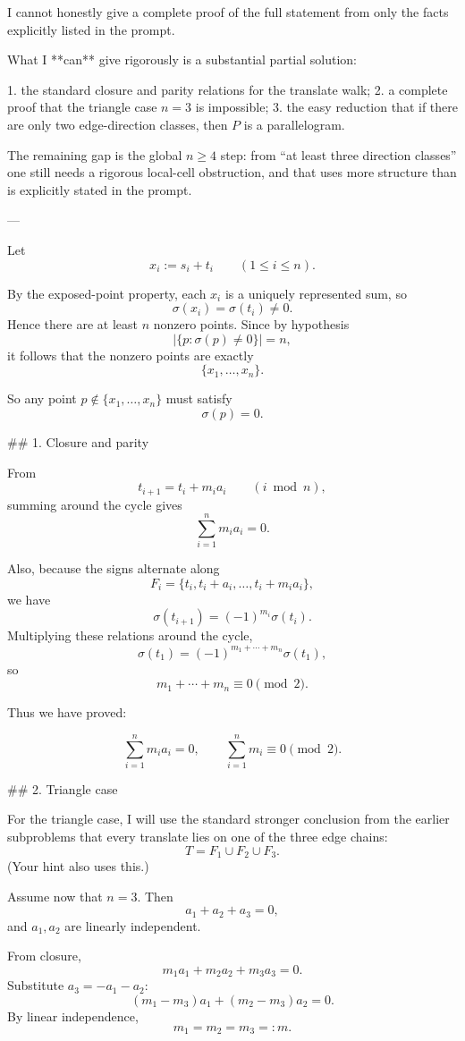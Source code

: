 I cannot honestly give a complete proof of the full statement from only the facts explicitly listed in the prompt.

What I **can** give rigorously is a substantial partial solution:

1. the standard closure and parity relations for the translate walk;
2. a complete proof that the triangle case \(n=3\) is impossible;
3. the easy reduction that if there are only two edge-direction classes, then \(P\) is a parallelogram.

The remaining gap is the global \(n\ge 4\) step: from “at least three direction classes” one still needs a rigorous local-cell obstruction, and that uses more structure than is explicitly stated in the prompt.

---

Let
\[
x_i:=s_i+t_i \qquad (1\le i\le n).
\]

By the exposed-point property, each \(x_i\) is a uniquely represented sum, so
\[
\sigma(x_i)=\sigma(t_i)\neq 0.
\]
Hence there are at least \(n\) nonzero points. Since by hypothesis
\[
|\{p:\sigma(p)\neq 0\}|=n,
\]
it follows that the nonzero points are exactly
\[
\{x_1,\dots,x_n\}.
\]

So any point \(p\notin \{x_1,\dots,x_n\}\) must satisfy
\[
\sigma(p)=0.
\]

## 1. Closure and parity

From
\[
t_{i+1}=t_i+m_i a_i \qquad (i \bmod n),
\]
summing around the cycle gives
\[
\sum_{i=1}^n m_i a_i = 0.
\]

Also, because the signs alternate along
\[
F_i=\{t_i,t_i+a_i,\dots,t_i+m_i a_i\},
\]
we have
\[
\sigma(t_{i+1}) = (-1)^{m_i}\sigma(t_i).
\]
Multiplying these relations around the cycle,
\[
\sigma(t_1)=(-1)^{m_1+\cdots+m_n}\sigma(t_1),
\]
so
\[
m_1+\cdots+m_n \equiv 0 \pmod 2.
\]

Thus we have proved:

\[
\boxed{\sum_{i=1}^n m_i a_i=0,\qquad \sum_{i=1}^n m_i\equiv 0\pmod 2.}
\]

## 2. Triangle case

For the triangle case, I will use the standard stronger conclusion from the earlier subproblems that every translate lies on one of the three edge chains:
\[
T=F_1\cup F_2\cup F_3.
\]
(Your hint also uses this.)

Assume now that \(n=3\). Then
\[
a_1+a_2+a_3=0,
\]
and \(a_1,a_2\) are linearly independent.

From closure,
\[
m_1a_1+m_2a_2+m_3a_3=0.
\]
Substitute \(a_3=-a_1-a_2\):
\[
(m_1-m_3)a_1+(m_2-m_3)a_2=0.
\]
By linear independence,
\[
m_1=m_2=m_3=:m.
\]

